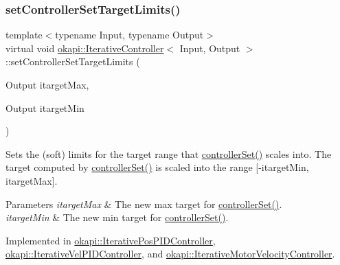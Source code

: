 \subsubsection{\texorpdfstring{setControllerSetTargetLimits()}{setControllerSetTargetLimits()}}
{\footnotesize\ttfamily template$<$typename Input, typename Output$>$ \\
virtual void \mbox{\hyperlink{classokapi_1_1IterativeController}{okapi\+::\+Iterative\+Controller}}$<$ Input, Output $>$\+::set\+Controller\+Set\+Target\+Limits (\begin{DoxyParamCaption}\item[{Output}]{itarget\+Max,  }\item[{Output}]{itarget\+Min }\end{DoxyParamCaption})\hspace{0.3cm}{\ttfamily [pure virtual]}}

Sets the (soft) limits for the target range that \mbox{\hyperlink{classokapi_1_1ControllerOutput_a360c08f0c10b36f882d6d3100c2cad49}{controller\+Set()}} scales into. The target computed by \mbox{\hyperlink{classokapi_1_1ControllerOutput_a360c08f0c10b36f882d6d3100c2cad49}{controller\+Set()}} is scaled into the range \mbox{[}-\/itarget\+Min, itarget\+Max\mbox{]}.


\begin{DoxyParams}{Parameters}
{\em itarget\+Max} & The new max target for \mbox{\hyperlink{classokapi_1_1ControllerOutput_a360c08f0c10b36f882d6d3100c2cad49}{controller\+Set()}}. \\
\hline
{\em itarget\+Min} & The new min target for \mbox{\hyperlink{classokapi_1_1ControllerOutput_a360c08f0c10b36f882d6d3100c2cad49}{controller\+Set()}}. \\
\hline
\end{DoxyParams}


Implemented in \mbox{\hyperlink{classokapi_1_1IterativePosPIDController_a556937096c9a1331e705a8fa9175c884}{okapi\+::\+Iterative\+Pos\+P\+I\+D\+Controller}}, \mbox{\hyperlink{classokapi_1_1IterativeVelPIDController_a054d5bff10ba504b9f72db567ad45bfb}{okapi\+::\+Iterative\+Vel\+P\+I\+D\+Controller}}, and \mbox{\hyperlink{classokapi_1_1IterativeMotorVelocityController_a083db063a4f8f15787a0c97068eef755}{okapi\+::\+Iterative\+Motor\+Velocity\+Controller}}.

\mbox{\label{classokapi_1_1IterativeController_ae1a7d9bd29d176a26bcc70c741f0d50f}} 
